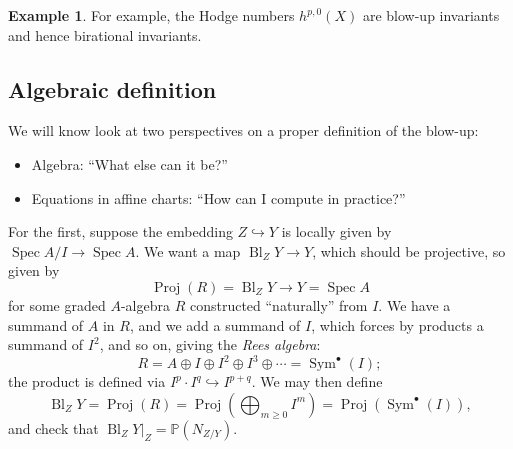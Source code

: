\documentclass{article}
\theoremstyle{definition}
\newtheorem*{example}{Example}
\DeclareMathOperator{\Spec}{Spec}
\DeclareMathOperator{\Proj}{Proj}
\DeclareMathOperator{\Sym}{Sym}
\DeclareMathOperator{\Bl}{Bl}
\renewcommand{\P}{\mathbb{P}}
\begin{document}
\begin{example}
    For example, the Hodge numbers $h^{p,0}(X)$ are blow-up invariants and hence
    birational invariants.
\end{example}

\subsection*{Algebraic definition}

We will know look at two perspectives on a proper definition of the blow-up:
\begin{itemize}
    \item Algebra: ``What else can it be?''
    \item Equations in affine charts: ``How can I compute in practice?''
\end{itemize}

For the first, suppose the embedding $Z\hookrightarrow Y$ is locally given by
$\Spec A/I\to\Spec A$. We want a map $\Bl_ZY\to Y$, which should be projective,
so given by
\begin{equation*}
    \Proj(R) = \Bl_ZY \to Y = \Spec A
\end{equation*}
for some graded $A$-algebra $R$ constructed ``naturally'' from $I$. We have a
summand of $A$ in $R$, and we add a summand of $I$, which forces by products a
summand of $I^2$, and so on, giving the \emph{Rees algebra}:
\begin{equation*}
    R = A\oplus I\oplus I^2\oplus I^3\oplus\cdots = \Sym^\bullet(I);
\end{equation*}
the product is defined via $I^p\cdot I^q\hookrightarrow I^{p+q}$. We may then
define
\begin{equation*}
    \Bl_ZY = \Proj(R) = \Proj(\bigoplus_{m\ge0}I^m) = \Proj(\Sym^\bullet(I)),
\end{equation*}
and check that $\Bl_ZY|_Z=\P(N_{Z/Y})$.
\end{document}
